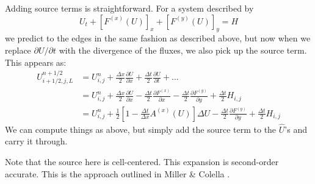 Adding source terms is straightforward.  For
a system described by
\begin{equation}
U_t + [F^{(x)}(U)]_x + [F^{(y)}(U)]_y = H
\end{equation}
we predict to the edges in the same fashion as described above, but now
when we replace $\partial U/\partial t$ with the divergence of the
fluxes, we also pick up the source term.  This appears as:
\begin{align}
U_{i+1/2,j,L}^{n+1/2} &= U_{i,j}^n
            + \frac{\Delta x}{2} \frac{\partial U}{\partial x}
            + \frac{\Delta t}{2} \frac{\partial U}{\partial t} + \ldots \\
&= U_{i,j}^n + \frac{\Delta x}{2} \frac{\partial U}{\partial x}
              - \frac{\Delta t}{2} \frac{\partial F^{(x)}}{\partial x}
              - \frac{\Delta t}{2} \frac{\partial F^{(y)}}{\partial y}
              + \frac{\Delta t}{2} H_{i,j} \\
&= U_{i,j}^n
 + \frac{1}{2} \left [1 -\frac{\Delta t}{\Delta x} A^{(x)}(U)\right ] \Delta U
 - \frac{\Delta t}{2} \frac{\partial F^{(y)}}{\partial y}
 + \frac{\Delta t}{2} H_{i,j}
  \label{eq:Utaylorstatesource}
\end{align}
We can compute things as above, but simply add the source term to the
$\hat{U}$'s and carry it through.

Note that the source here is cell-centered.  This expansion is
second-order accurate.  This is the approach outlined in Miller
\& Colella \cite{millercolella:2002}.

